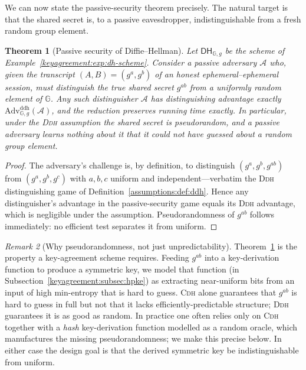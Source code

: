 \documentclass[11pt,a4paper]{article}
\newtheorem{theorem}{Theorem}[section]
\theoremstyle{definition}
\theoremstyle{remark}
\newtheorem{remark}[theorem]{Remark}
\newcommand{\G}{\ensuremath{\mathbb{G}}}
\begin{document}
We can now state the passive-security theorem precisely. The natural target is that the shared secret is, to a passive eavesdropper, indistinguishable from a fresh random group element.

\begin{theorem}[Passive security of Diffie--Hellman]\label{keyagreement:thm:passive}
Let \(\mathsf{DH}_{\G,g}\) be the scheme of Example~\ref{keyagreement:exp:dh-scheme}. Consider a passive adversary \(\mathcal{A}\) who, given the transcript \((A, B) = (g^a, g^b)\) of an honest ephemeral--ephemeral session, must distinguish the true shared secret \(g^{ab}\) from a uniformly random element of \(\G\). Any such distinguisher \(\mathcal{A}\) has distinguishing advantage exactly \(\mathrm{Adv}^{\mathrm{ddh}}_{\G,g}(\mathcal{A})\), and the reduction preserves running time exactly. In particular, under the \textsc{Ddh} assumption the shared secret is pseudorandom, and a passive adversary learns nothing about it that it could not have guessed about a random group element.
\end{theorem}

\begin{proof}
The adversary's challenge is, by definition, to distinguish \((g^a, g^b, g^{ab})\) from \((g^a, g^b, g^c)\) with \(a, b, c\) uniform and independent---verbatim the \textsc{Ddh} distinguishing game of Definition~\ref{assumptions:def:ddh}. Hence any distinguisher's advantage in the passive-security game equals its \textsc{Ddh} advantage, which is negligible under the assumption. Pseudorandomness of \(g^{ab}\) follows immediately: no efficient test separates it from uniform.
\end{proof}

\begin{remark}[Why pseudorandomness, not just unpredictability]\label{keyagreement:rem:whyddh}
Theorem~\ref{keyagreement:thm:passive} is the property a key-agreement scheme requires. Feeding \(g^{ab}\) into a key-derivation function to produce a symmetric key, we model that function (in Subsection~\ref{keyagreement:subsec:hpke}) as extracting near-uniform bits from an input of high min-entropy that is hard to guess. \textsc{Cdh} alone guarantees that \(g^{ab}\) is hard to guess in full but not that it lacks efficiently-predictable structure; \textsc{Ddh} guarantees it is as good as random. In practice one often relies only on \textsc{Cdh} together with a \emph{hash} key-derivation function modelled as a random oracle, which manufactures the missing pseudorandomness; we make this precise below. In either case the design goal is that the derived symmetric key be indistinguishable from uniform.
\end{remark}
\end{document}
